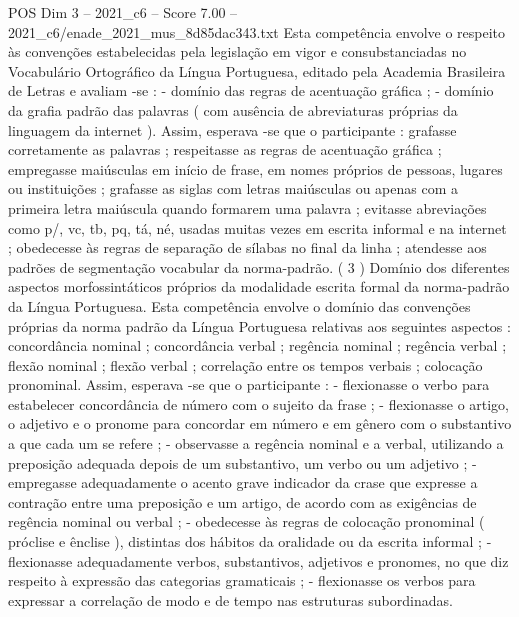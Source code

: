 \begin{textsample}{POS Dim 3 – 2021\_c6 – Score 7.00 – 2021\_c6/enade\_2021\_mus\_8d85dac343.txt}
Esta competência envolve o respeito às convenções estabelecidas pela legislação em vigor e consubstanciadas no Vocabulário Ortográfico da Língua Portuguesa, editado pela Academia Brasileira de Letras e avaliam -se : - domínio das regras de acentuação gráfica ; - domínio da grafia padrão das palavras ( com ausência de abreviaturas próprias da linguagem da internet ).
Assim, esperava -se que o participante : grafasse corretamente as palavras ; respeitasse as regras de acentuação gráfica ; empregasse maiúsculas em início de frase, em nomes próprios de pessoas, lugares ou instituições ; grafasse as siglas com letras maiúsculas ou apenas com a primeira letra maiúscula quando formarem uma palavra ; evitasse abreviações como p/, vc, tb, pq, tá, né, usadas muitas vezes em escrita informal e na internet ; obedecesse às regras de separação de sílabas no final da linha ; atendesse aos padrões de segmentação vocabular da norma-padrão. ( 3 ) Domínio dos diferentes aspectos morfossintáticos próprios da modalidade escrita formal da norma-padrão da Língua Portuguesa.
Esta competência envolve o domínio das convenções próprias da norma padrão da Língua Portuguesa relativas aos seguintes aspectos : concordância nominal ; concordância verbal ; regência nominal ; regência verbal ; flexão nominal ; flexão verbal ; correlação entre os tempos verbais ; colocação pronominal.
Assim, esperava -se que o participante : - flexionasse o verbo para estabelecer concordância de número com o sujeito da frase ; - flexionasse o artigo, o adjetivo e o pronome para concordar em número e em gênero com o substantivo a que cada um se refere ; - observasse a regência nominal e a verbal, utilizando a preposição adequada depois de um substantivo, um verbo ou um adjetivo ; - empregasse adequadamente o acento grave indicador da crase que expresse a contração entre uma preposição e um artigo, de acordo com as exigências de regência nominal ou verbal ; - obedecesse às regras de colocação pronominal ( próclise e ênclise ), distintas dos hábitos da oralidade ou da escrita informal ; - flexionasse adequadamente verbos, substantivos, adjetivos e pronomes, no que diz respeito à expressão das categorias gramaticais ; - flexionasse os verbos para expressar a correlação de modo e de tempo nas estruturas subordinadas.

\end{textsample}
